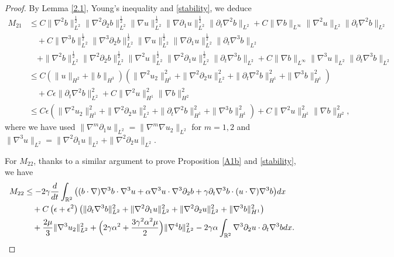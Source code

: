 \documentclass[reqno,11pt]{amsart}
\def\R{\mathbb R}
\numberwithin{Thm}{section}
\begin{document}
\begin{proof}
By Lemma \ref{2.1}, Young's inequality  and \eqref{stability}, we deduce
\begin{align}\label{H-1}
M_{21}&\leq
C\|\nabla^2b\|_{L^{2}}^{\frac{1}{2}}\|\nabla^2\partial_2b\|_{L^{2}}^{\frac{1}{2}}\|\nabla u\|_{L^{2}}^{\frac{1}{2}}\|\nabla\partial_1 u\|_{L^{2}}^{\frac{1}{2}}\|\partial_t\nabla^2 b\|_{L^2}+C\|\nabla b\|_{L^{\infty}}\|\nabla^2u\|_{L^{2}}\|\partial_t\nabla^2 b\|_{L^2}\nonumber\\
&\quad+C\|\nabla^3b\|_{L^{2}}^{\frac{1}{2}}\|\nabla^3\partial_2b\|_{L^{2}}^{\frac{1}{2}}\|\nabla u\|_{L^{2}}^{\frac{1}{2}}\|\nabla\partial_1 u\|_{L^{2}}^{\frac{1}{2}}\|\partial_t\nabla^3 b\|_{L^2}\nonumber\\
&\quad+
\|\nabla^2 b\|_{L^{2}}^{\frac{1}{2}}\|\nabla^2\partial_2b\|_{L^{2}}^{\frac{1}{2}}\|\nabla^2 u\|_{L^{2}}^{\frac{1}{2}}\|\nabla^2\partial_1 u\|_{L^{2}}^{\frac{1}{2}}\|\partial_t\nabla^3 b\|_{L^2}+C\|\nabla b\|_{L^{\infty}}\|\nabla^3u\|_{L^{2}}\|\partial_t\nabla^3 b\|_{L^2}\nonumber\\
&\leq
C(\|u\|_{H^{2}}+\|b\|_{H^{3}})(\|\nabla^2 u_2\|_{H^{1}}^2+\|\nabla^2\partial_2 u\|_{L^{2}}^2+\|\partial_t\nabla^2 b\|_{H^1}^2+\|\nabla^3 b\|_{H^1}^2)\nonumber\\
&\quad +C\epsilon\|\partial_t\nabla^2 b\|_{L^2}^2+C\|\nabla^2 u\|_{H^{1}}^2\|\nabla b\|_{H^{2}}^2\nonumber\\
&\leq
C\epsilon(\|\nabla^2 u_2\|_{H^{1}}^2+\|\nabla^2\partial_2 u\|_{L^{2}}^2+\|\partial_t\nabla^2 b\|_{H^1}^2+\|\nabla^3 b\|_{H^1}^2)+C\|\nabla^2 u\|_{H^{1}}^2\|\nabla b\|_{H^{2}}^2,
\end{align}
where we have used $\|\nabla^m\partial_1 u\|_{L^{2}}=\|\nabla^m \nabla u_2\|_{L^{2}}$ for $m=1,2$ and $\|\nabla^3 u\|_{L^{2}}=\|\nabla^2\partial_1 u\|_{L^{2}}+\|\nabla^2\partial_2 u\|_{L^{2}}$.


For $M_{22}$, thanks to a similar argument to prove Proposition \ref{A1b} and \eqref{stability}, we have
\begin{align}\label{GGGG}
		M_{22}&\leq
		-2\gamma\frac{d}{dt}\int_{\mathbb{R}^2}
		\big((b\cdot\nabla)\nabla^3 b\cdot\nabla^3 u
		+\alpha\nabla^3 u\cdot\nabla^3\partial_2 b
		+\gamma\partial_t\nabla^3 b\cdot (u\cdot\nabla)\nabla^3 b\big)dx
		\notag\\ &\quad+C\left(\epsilon+\epsilon^2\right)\left(\|\partial_t\nabla^3b\|_{L^2}^2
+\|\nabla^2\partial_1u\|_{L^2}^2+\|\nabla^2\partial_2u\|_{L^2}^2+\|\nabla^3 b\|_{H^1}^2\right)\notag\\
		&\quad+\frac{2\mu}{3}\|\nabla^3 u_2\|_{L^2}^2	+\Bigl(2\gamma\alpha^2+\frac{3\gamma^2\alpha^2\mu}{2}\Bigr)
		\|\nabla^4 b\|_{L^2}^2-2\gamma\alpha\int_{\R^2}\nabla^3\partial_2u\cdot\partial_t\nabla^3 b  dx.
	\end{align}



\end{proof}
\end{document}
